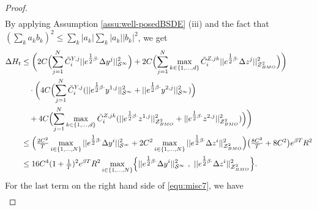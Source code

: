 \documentclass[10pt,a4paper]{article}
\theoremstyle{plain}
\theoremstyle{definition}
\numberwithin{equation}{section}
\begin{document}
\begin{proof}
\begin{align*}
\end{align*}
By applying Assumption \ref{assu:well-posedBSDE} (iii) and the fact that $(\sum_k a_k b_k)^2 \le \sum_k |a_k| \sum_k |a_k| | b_k|^2$, we get
\begin{align}
\Delta H_t &\leq \biggl(2C\Bigl(\sum_{j=1}^{N}\tilde{C}_{i}^{Y,j}||e^{\tfrac{1}{2}\beta\cdot}\Delta y^{j}||_{\mathcal{S}^{\infty}}^{2}\Bigr) + 2C\Bigl(\sum_{j=1}^{N}\max_{k \in \{1,...,d\}}\tilde{C}_{i}^{Z,jk}||e^{\tfrac{1}{2}\beta\cdot}\Delta z^{j}||_{\mathcal{Z}_{BMO}^{2}}^{2}\Bigr)\biggr) \nonumber \\
&\ \ \ \cdot \biggl(4C\Bigl(\sum_{j=1}^{N}\tilde{C}_{i}^{Y,j}(||e^{\tfrac{1}{2}\beta\cdot}y^{1,j}||_{\mathcal{S}^{\infty}}^{2} + ||e^{\tfrac{1}{2}\beta\cdot}y^{2,j}||_{\mathcal{S}^{\infty}}^{2})\Bigr) \nonumber \\
&\ \ \  + 4C\Bigl(\sum_{j=1}^{N}\max_{k \in \{1,...,d\}}\tilde{C}_{i}^{Z,jk}(||e^{\tfrac{1}{2}\beta\cdot}z^{1,j}||_{\mathcal{Z}_{BMO}^{2}}^{2} + ||e^{\tfrac{1}{2}\beta\cdot}z^{2,j}||_{\mathcal{Z}_{BMO}^{2}}^{2})\Bigr)\biggr) \nonumber \\
&\leq \Bigl(\tfrac{2C^{2}}{T}\max_{i \in \{1,...,N\}}||e^{\tfrac{1}{2}\beta\cdot}\Delta y^{i}||_{\mathcal{S}^{\infty}}^{2} + 2C^{2}\max_{i \in \{1,...,N\}}||e^{\tfrac{1}{2}\beta\cdot}\Delta z^{i}||_{\mathcal{Z}_{BMO}^{2}}^{2}\Bigr)\bigl(\tfrac{8C^{2}}{T} + 8C^{2}\bigr)e^{\beta T}R^{2} \nonumber \\
&\leq 16C^{4}(1+\tfrac{1}{T})^{2}e^{\beta T}R^{2}\max_{i \in \{1,...,N\}}\Bigl\{||e^{\tfrac{1}{2}\beta\cdot}\Delta y^{i}||_{\mathcal{S}^{\infty}}^{2} \ , \ ||e^{\tfrac{1}{2}\beta\cdot}\Delta z^{i}||_{\mathcal{Z}_{BMO}^{2}}^{2}\Bigr\}. \label{equ:misc9}
\end{align}
For the last term on the right hand side of \eqref{equ:misc7}, we have
\begin{align}

\end{align}
\end{proof}
\end{document}
